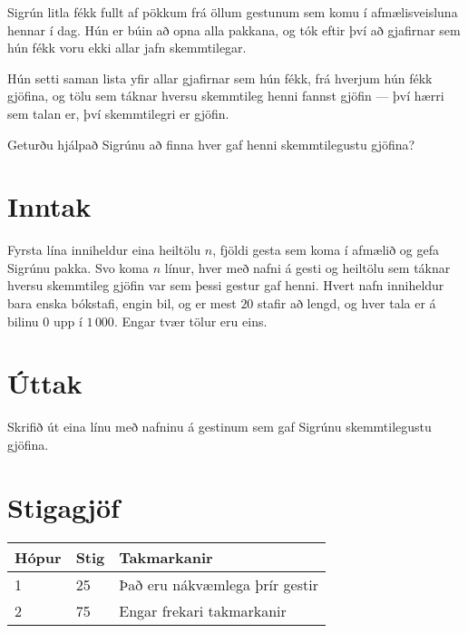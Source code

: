 %
Sigrún litla fékk fullt af pökkum frá öllum gestunum sem komu í afmælisveisluna
hennar í dag. Hún er búin að opna alla pakkana, og tók eftir því að gjafirnar
sem hún fékk voru ekki allar jafn skemmtilegar.

Hún setti saman lista yfir allar gjafirnar sem hún fékk, frá hverjum hún fékk
gjöfina, og tölu sem táknar hversu skemmtileg henni fannst gjöfin --- því hærri
sem talan er, því skemmtilegri er gjöfin.

Geturðu hjálpað Sigrúnu að finna hver gaf henni skemmtilegustu gjöfina?

\section*{Inntak}
Fyrsta lína inniheldur eina heiltölu $n$, fjöldi gesta sem koma í afmælið og
gefa Sigrúnu pakka. Svo koma $n$ línur, hver með nafni á gesti og heiltölu sem
táknar hversu skemmtileg gjöfin var sem þessi gestur gaf henni.
Hvert nafn inniheldur bara enska bókstafi, engin bil, og er mest $20$ stafir að lengd,
og hver tala er á bilinu $0$ upp í $1\,000$. Engar tvær tölur eru eins.

\section*{Úttak}
Skrifið út eina línu með nafninu á gestinum sem gaf Sigrúnu skemmtilegustu
gjöfina.

\section*{Stigagjöf}
\begin{tabular}{|l|l|l|}
\hline
Hópur & Stig & Takmarkanir \\ \hline
1     & 25  & Það eru nákvæmlega þrír gestir\\ \hline
2     & 75  & Engar frekari takmarkanir\\ \hline
\end{tabular}
